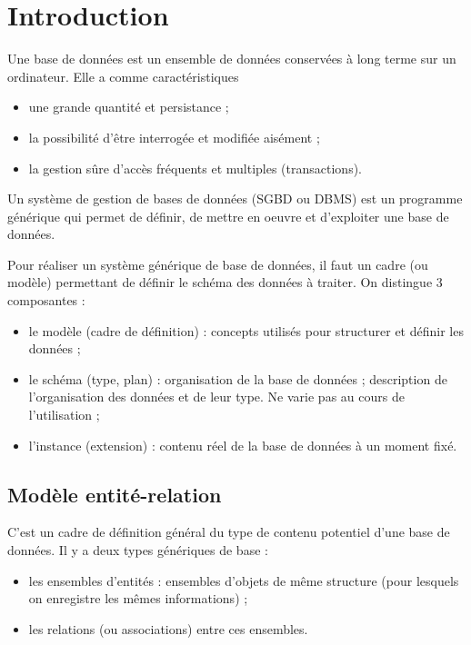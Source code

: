 \chapter{Introduction}

Une base de données est un ensemble de données conservées à long terme sur un ordinateur. Elle a comme caractéristiques

\begin{itemize}
	\item une grande quantité et persistance ;
	\item la possibilité d'être interrogée et modifiée aisément ;
	\item la gestion sûre d'accès fréquents et multiples (transactions).
\end{itemize}

Un système de gestion de bases de données (SGBD ou DBMS) est un programme générique qui permet de définir, de mettre en oeuvre et d'exploiter une base de données.

Pour réaliser un système générique de base de données, il faut un cadre (ou modèle) permettant de définir le schéma des données à traiter. On distingue 3 composantes :

\begin{itemize}
	\item le modèle (cadre de définition) : concepts utilisés pour structurer et définir les données ;
	\item le schéma (type, plan) : organisation de la base de données ; description de l'organisation des données et de leur type. Ne varie pas au cours de l'utilisation ;
	\item l'instance (extension) : contenu réel de la base de données à un moment fixé.
\end{itemize}

	\section{Modèle entité-relation}
	
	C'est un cadre de définition général du type de contenu potentiel d'une base de données. Il y a deux types génériques de base :
	
	\begin{itemize}
		\item les ensembles d'entités : ensembles d'objets de même structure (pour lesquels on enregistre les mêmes informations) ;
		\item les relations (ou associations) entre ces ensembles.
	\end{itemize}
	
